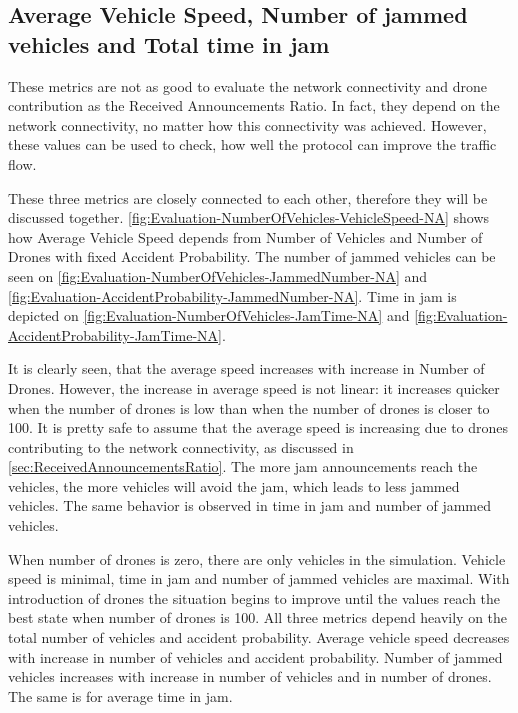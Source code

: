 \documentclass[]{nsm-thesis}
\begin{document}
\subsection{Average Vehicle Speed, Number of jammed vehicles and Total time in jam}

These metrics are not as good to evaluate the network connectivity and drone contribution as the Received Announcements Ratio. In fact, they depend on the network connectivity, no matter how this connectivity was achieved. However, these values can be used to check, how well the protocol can improve the traffic flow.

These three metrics are closely connected to each other, therefore they will be discussed together. \cref{fig:Evaluation-NumberOfVehicles-VehicleSpeed-NA} shows how Average Vehicle Speed depends from Number of Vehicles and Number of Drones with fixed Accident Probability. The number of jammed vehicles can be seen on \cref{fig:Evaluation-NumberOfVehicles-JammedNumber-NA} and \cref{fig:Evaluation-AccidentProbability-JammedNumber-NA}. Time in jam is depicted on \cref{fig:Evaluation-NumberOfVehicles-JamTime-NA} and \cref{fig:Evaluation-AccidentProbability-JamTime-NA}.

It is clearly seen, that the average speed increases with increase in Number of Drones. However, the increase in average speed is not linear: it increases quicker when the number of drones is low than when the number of drones is closer to 100. It is pretty safe to assume that the average speed is increasing due to drones contributing to the network connectivity, as discussed in \cref{sec:ReceivedAnnouncementsRatio}. The more jam announcements reach the vehicles, the more vehicles will avoid the jam, which leads to less jammed vehicles. The same behavior is observed in time in jam and number of jammed vehicles.

When number of drones is zero, there are only vehicles in the simulation. Vehicle speed is minimal, time in jam and number of jammed vehicles are maximal. With introduction of drones the situation begins to improve until the values reach the best state when number of drones is 100. All three metrics depend heavily on the total number of vehicles and accident probability. Average vehicle speed decreases with increase in number of vehicles and accident probability. Number of jammed vehicles increases with increase in number of vehicles and in number of drones. The same is for average time in jam.
\end{document}
